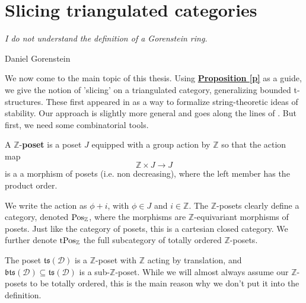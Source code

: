 \section{Slicing triangulated categories} 
\epigraph{\textit{I do not understand the definition of a Gorenstein ring.}}{Daniel Gorenstein}
\vspace{10 mm}

We now come to the main topic of this thesis. Using \hyperref[p]{\textbf{Proposition \ref*{p}}} as a guide, we give the notion of 'slicing' on a triangulated category, generalizing bounded t-structures. These first appeared in \cite{bri} as a way to formalize string-theoretic ideas of stability. Our approach is slightly more general and goes along the lines of \cite{gor}. But first, we need some combinatorial tools. \\

\begin{defn}
A $\mathbb{Z}$-\textbf{poset} is a poset $J$ equipped with a group action by $\mathbb{Z}$ so that the action map $$\mathbb{Z} \times J \longrightarrow J$$ is a a morphism of posets (i.e. non decreasing), where the left member has the product order. 
\end{defn} 

We write the action as $\phi+i$, with $\phi \in J$ and $i \in \mathbb{Z}$. The $\mathbb{Z}$-posets clearly define a category, denoted $\textnormal{Pos}_{\mathbb{Z}}$, where the morphisms are $\mathbb{Z}$-equivariant morphisms of posets. Just like the category of posets, this is a cartesian closed category. We further denote $\textnormal{tPos}_{\mathbb{Z}}$ the full subcategory of totally ordered $\mathbb{Z}$-posets. \\

\begin{exmp}
The poset $\mathfrak{ts}(\mathscr{D})$ is a $\mathbb{Z}$-poset with $\mathbb{Z}$ acting by translation, and $\mathfrak{bts}(\mathscr{D}) \subseteq \mathfrak{ts}(\mathscr{D})$ is a sub-$\mathbb{Z}$-poset. While we will almost always assume our $\mathbb{Z}$-posets to be totally ordered, this is the main reason why we don't put it into the definition. 
\end{exmp}

